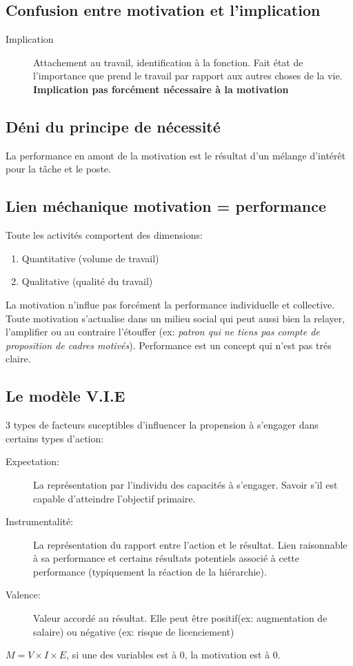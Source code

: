 \documentclass[11pt]{article} %
\begin{document}
	\subsection{Confusion entre motivation et l'implication}
		\begin{description}
		\item[Implication] Attachement au travail, identification à la fonction. Fait état de l'importance
		que prend le travail par rapport aux autres choses de la vie. \textbf{Implication pas forcément 
		nécessaire à la motivation}
		\end{description}

	\subsection{Déni du principe de nécessité}
		La performance en amont de la motivation est le résultat d'un mélange d'intérêt pour la tâche et le poste.

	\subsection{Lien méchanique motivation = performance}
		Toute les activités comportent des dimensions:
		\begin{enumerate}
			\item Quantitative (volume de travail)
			\item Qualitative (qualité du travail)
		\end{enumerate}
		La motivation n'influe pas forcément la performance individuelle et collective. Toute motivation 
		s'actualise dans un milieu social qui peut aussi bien la relayer, l'amplifier ou au contraire l'étouffer (ex: \textit{patron qui ne tiens pas compte de proposition de cadres motivés}). 
		Performance est un concept qui n'est pas trés claire.

	\subsection{Le modèle V.I.E}
		3 types de facteurs suceptibles d'influencer la propension à s'engager dans certains types d'action:
		\begin{description}
			\item[Expectation: ] La représentation par l'individu des capacités à s'engager. Savoir s'il est capable d'atteindre l'objectif primaire. 
			\item[Instrumentalité: ] La représentation du rapport entre l'action et le résultat. Lien raisonnable à sa performance et certains résultats potentiels associé à cette performance (typiquement la réaction de la hiérarchie).
			\item[Valence: ] Valeur accordé au résultat. Elle peut être positif(ex: augmentation de salaire) ou	négative (ex: risque de licenciement)
		\end{description}
		$M=V\times I \times E$, si une des variables est à 0, la motivation est à 0. 
\end{document}
